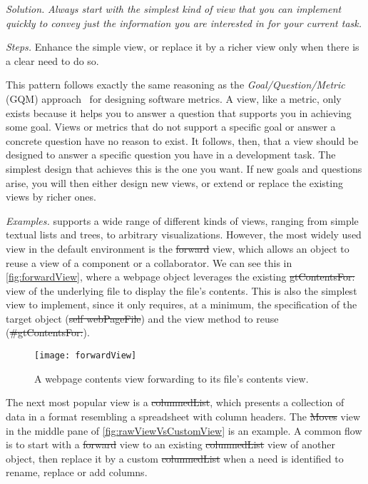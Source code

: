 \documentclass[sigconf,screen]{acmart}
\newcommand\cp[1]{\nbe{Cesare}{#1}{olive}} %
\newcommand{\GT}{\lst{GT}\xspace} %
\newcommand{\patsec}[1]{\noindent\textit{#1.}\xspace}
\begin{document}
\patsec{Solution}
\emph{Always start with the simplest kind of view that you can implement quickly to convey just the information you are interested in for your current task.}

\patsec{Steps}
Enhance the simple view, or replace it by a richer view only when there is a clear need to do so.

This pattern follows exactly the same reasoning as the \emph{Goal/Question/Metric} (GQM) approach~\cite{Basi94a} for designing software metrics.
A view, like a metric, only exists because it helps you to answer a question that supports you in achieving some goal.
Views or metrics that do not support a specific goal or answer a concrete question have no reason to exist.
It follows, then, that a view should be designed to answer a specific question you have in a development task.
The simplest design that achieves this is the one you want.
If new goals and questions arise, you will then either design new views, or extend or replace the existing views by richer ones.

\patsec{Examples}
\GT supports a wide range of different kinds of views, ranging from simple textual lists and trees, to arbitrary visualizations.
However, the most widely used view in the default environment is the \st{forward} view, which allows an object to reuse a view of a component or a collaborator.
We can see this in \autoref{fig:forwardView}, where a webpage object leverages the existing \st{gtContentsFor:} view of the underlying file to display the file's contents.
This is also the simplest view to implement, since it only requires, at a minimum, the specification of the target object (\st{self webPageFile}) and the view method to reuse (\st{#gtContentsFor:}).

\begin{figure}[h]
  \texttt{[image: forwardView]}
  \caption{A webpage contents view forwarding to its file's contents view.}
  \label{fig:forwardView}
\end{figure}

The next most popular view is a \st{columnedList}, which presents a collection of data in a format resembling a spreadsheet with column headers.
The \st{Moves} view in the middle pane of \autoref{fig:rawViewVsCustomView} is an example.
A common flow is to start with a \st{forward} view to an existing \st{columnedList} view of another object, then replace it by a custom \st{columnedList} when a need is identified to rename, replace or add columns.
\end{document}
